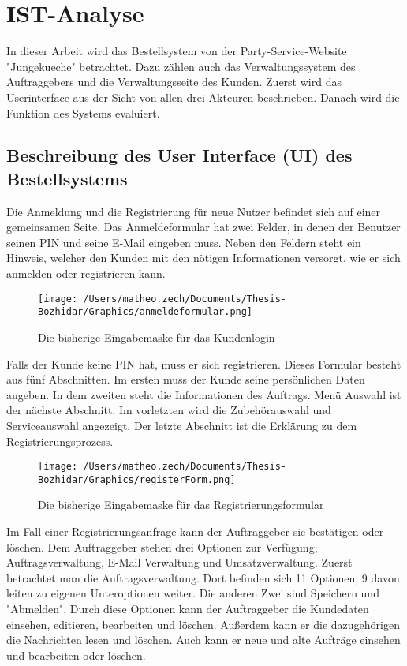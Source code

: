 \chapter{IST-Analyse}
In dieser Arbeit wird das Bestellsystem von der Party-Service-Website "Jungekueche" betrachtet. Dazu zählen auch das Verwaltungssystem des Auftraggebers und die Verwaltungsseite des Kunden. Zuerst wird das Userinterface aus der Sicht von allen drei Akteuren beschrieben. Danach wird die Funktion des Systems evaluiert.

\section{Beschreibung des User Interface (UI) des Bestellsystems} 

Die Anmeldung und die Registrierung für neue Nutzer befindet sich auf einer gemeinsamen Seite. 
Das Anmeldeformular hat zwei Felder, in denen der Benutzer seinen PIN und seine E-Mail eingeben muss. Neben den Feldern steht ein Hinweis, welcher den Kunden mit den nötigen Informationen versorgt, wie er sich anmelden oder registrieren kann.  


\begin{figure}[h]
	\centering
	\texttt{[image: /Users/matheo.zech/Documents/Thesis-Bozhidar/Graphics/anmeldeformular.png]}
	\caption[Anmeldeformular]{Die bisherige Eingabemaske für das Kundenlogin}
	\label{fig:anmeldeformular}
\end{figure}

Falls der Kunde keine PIN hat, muss er sich registrieren. Dieses Formular besteht aus fünf Abschnitten. Im ersten muss der Kunde seine persönlichen Daten angeben. In dem zweiten steht die Informationen des Auftrags. Menü Auswahl ist der nächste Abschnitt. Im vorletzten wird die Zubehörauswahl und Serviceauswahl angezeigt. Der letzte Abschnitt ist die Erklärung zu dem Registrierungsprozess. 

\begin{figure}
	\centering
	\texttt{[image: /Users/matheo.zech/Documents/Thesis-Bozhidar/Graphics/registerForm.png]}
	\caption[Registerformular]{Die bisherige Eingabemaske für das Registrierungsformular}
	\label{fig:registerForm}
\end{figure}

Im Fall einer Registrierungsanfrage kann der Auftraggeber sie bestätigen oder löschen. Dem Auftraggeber stehen drei Optionen zur Verfügung; Auftragsverwaltung, E-Mail Verwaltung und Umsatzverwaltung. Zuerst betrachtet man die Auftragsverwaltung. Dort befinden sich 11 Optionen, 9 davon leiten zu eigenen Unteroptionen weiter. Die anderen Zwei sind Speichern und "Abmelden". Durch diese Optionen kann der Auftraggeber die Kundedaten einsehen, editieren, bearbeiten und löschen. Außerdem kann er die dazugehörigen die Nachrichten lesen und löschen. Auch kann er neue und alte Aufträge einsehen und bearbeiten oder löschen.

